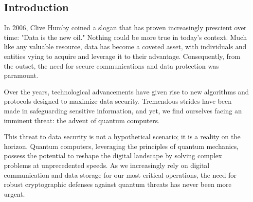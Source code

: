 \begin{center}
\section*{Introduction}
\end{center}

In 2006, Clive Humby coined a slogan that has proven increasingly prescient over time: "Data is the new oil." Nothing could be more true in today's context. Much like any 
valuable resource, data has become a coveted asset, with individuals and 
entities vying to acquire and leverage it to their advantage. Consequently, 
from the outset, the need for secure communications and data protection was 
paramount.

Over the years, technological advancements have given rise to new algorithms 
and protocols designed to maximize data security. Tremendous strides have 
been made in safeguarding sensitive information, and yet, we find ourselves 
facing an imminent threat: the advent of quantum computers.

This threat to data security is not a hypothetical scenario; it is a reality 
on the horizon. Quantum computers, leveraging the principles of quantum 
mechanics, possess the potential to reshape the digital landscape by solving 
complex problems at unprecedented speeds. As we increasingly rely on digital 
communication and data storage for our most critical operations, the need for 
robust cryptographic defenses against quantum threats has never been more 
urgent.
